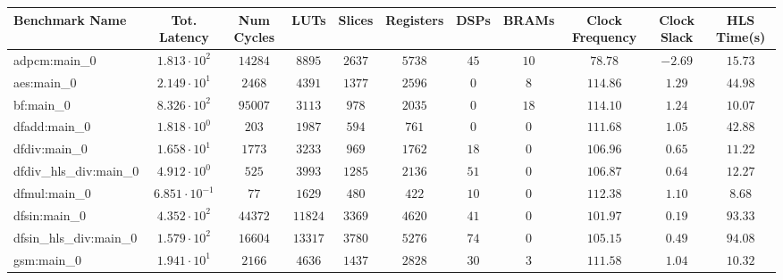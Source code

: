 \begin{tabular}{|l|c|c|c|c|c|c|c|c|c|c|}
\hline
Benchmark Name          & Tot. Latency            & Num Cycles & LUTs      & Slices    & Registers & DSPs    & BRAMs   & Clock Frequency & Clock Slack & HLS Time(s) \\
\hline
adpcm:main\_0           & $ 1.813 \cdot 10^{2}  $ & $ 14284  $ & $ 8895  $ & $ 2637  $ & $ 5738  $ & $ 45  $ & $ 10  $ & $ 78.78       $ & $ -2.69   $ & $ 15.73   $ \\
aes:main\_0             & $ 2.149 \cdot 10^{1}  $ & $ 2468   $ & $ 4391  $ & $ 1377  $ & $ 2596  $ & $ 0   $ & $ 8   $ & $ 114.86      $ & $ 1.29    $ & $ 44.98   $ \\
bf:main\_0              & $ 8.326 \cdot 10^{2}  $ & $ 95007  $ & $ 3113  $ & $ 978   $ & $ 2035  $ & $ 0   $ & $ 18  $ & $ 114.10      $ & $ 1.24    $ & $ 10.07   $ \\
dfadd:main\_0           & $ 1.818 \cdot 10^{0}  $ & $ 203    $ & $ 1987  $ & $ 594   $ & $ 761   $ & $ 0   $ & $ 0   $ & $ 111.68      $ & $ 1.05    $ & $ 42.88   $ \\
dfdiv:main\_0           & $ 1.658 \cdot 10^{1}  $ & $ 1773   $ & $ 3233  $ & $ 969   $ & $ 1762  $ & $ 18  $ & $ 0   $ & $ 106.96      $ & $ 0.65    $ & $ 11.22   $ \\
dfdiv\_hls\_div:main\_0 & $ 4.912 \cdot 10^{0}  $ & $ 525    $ & $ 3993  $ & $ 1285  $ & $ 2136  $ & $ 51  $ & $ 0   $ & $ 106.87      $ & $ 0.64    $ & $ 12.27   $ \\
dfmul:main\_0           & $ 6.851 \cdot 10^{-1} $ & $ 77     $ & $ 1629  $ & $ 480   $ & $ 422   $ & $ 10  $ & $ 0   $ & $ 112.38      $ & $ 1.10    $ & $ 8.68    $ \\
dfsin:main\_0           & $ 4.352 \cdot 10^{2}  $ & $ 44372  $ & $ 11824 $ & $ 3369  $ & $ 4620  $ & $ 41  $ & $ 0   $ & $ 101.97      $ & $ 0.19    $ & $ 93.33   $ \\
dfsin\_hls\_div:main\_0 & $ 1.579 \cdot 10^{2}  $ & $ 16604  $ & $ 13317 $ & $ 3780  $ & $ 5276  $ & $ 74  $ & $ 0   $ & $ 105.15      $ & $ 0.49    $ & $ 94.08   $ \\
gsm:main\_0             & $ 1.941 \cdot 10^{1}  $ & $ 2166   $ & $ 4636  $ & $ 1437  $ & $ 2828  $ & $ 30  $ & $ 3   $ & $ 111.58      $ & $ 1.04    $ & $ 10.32   $ \\

\end{tabular}
